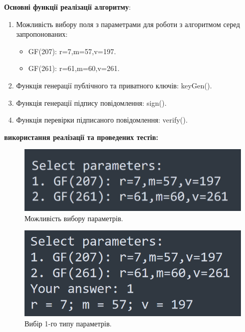 \vspace{0.5cm}
\textbf{Основні функції реалізації алгоритму}:
\begin{enumerate}
    \item Можливість вибору поля з параметрами для роботи з алгоритмом серед запропонованих:
    \begin{itemize}
        \item GF(207): r=7,m=57,v=197.
        \item GF(261): r=61,m=60,v=261.
    \end{itemize}
    \item Функція генерації публічного та приватного ключів: keyGen().
    \item Функція генерації підпису повідомлення: sign().
    \item Функція перевірки підписаного повідомлення: verify(). 
\end{enumerate}

\vspace{0.5cm}
\textbf{ використання реалізації та проведених тестів:}

\begin{figure}[ht]
    \centering
    \includegraphics[scale = 0.55]{IMAGES/select_parameters.png}
    \caption{Можливість вибору параметрів.}
    \label{fig1}
\end{figure}

\begin{figure}[ht]
    \centering
    \includegraphics[scale = 0.7]{IMAGES/select_param1.png}
    \caption{Вибір 1-го типу параметрів.}
    \label{fig1}
\end{figure}

